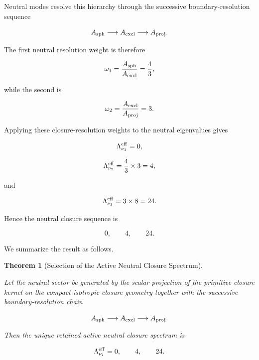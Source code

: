 \documentclass[11pt]{article}
\newtheorem{theorem}{Theorem}[section]
\theoremstyle{definition}
\theoremstyle{remark}
\begin{document}
Neutral modes resolve this hierarchy through the successive
boundary-resolution sequence

\begin{equation}
A_{\rm sph}
\longrightarrow
A_{\rm excl}
\longrightarrow
A_{\rm proj}.
\label{eq:neutral_resolution_chain}
\end{equation}

The first neutral resolution weight is therefore

\begin{equation}
\omega_1 =
\frac{A_{\rm sph}}
{A_{\rm excl}} =
\frac{4}{3},
\end{equation}

while the second is

\begin{equation}
\omega_2 =
\frac{A_{\rm excl}}
{A_{\rm proj}} =
3.
\end{equation}

Applying these closure-resolution weights to the neutral
eigenvalues gives

\begin{equation}
\Lambda_{\nu_1}^{\rm eff} =
0,
\end{equation}

\begin{equation}
\Lambda_{\nu_2}^{\rm eff} =
\frac{4}{3}
\times
3
=
4,
\end{equation}

and

\begin{equation}
\Lambda_{\nu_3}^{\rm eff} =
3
\times
8
=
24.
\end{equation}

Hence the neutral closure sequence is

\begin{equation}
0,
\qquad
4,
\qquad
24.
\label{eq:neutral_closure_sequence}
\end{equation}

We summarize the result as follows.

\begin{theorem}[Selection of the Active Neutral Closure Spectrum]
\label{thm:active_neutral_closure_selection}

Let the neutral sector be generated by the scalar projection of
the primitive closure kernel on the compact isotropic closure
geometry together with the successive boundary-resolution chain

\begin{equation}
A_{\rm sph}
\longrightarrow
A_{\rm excl}
\longrightarrow
A_{\rm proj}.
\end{equation}

Then the unique retained active neutral closure spectrum is

\begin{equation}
\Lambda_{\nu_i}^{\rm eff}
=
0,
\qquad
4,
\qquad
24.
\end{equation}

\end{theorem}
\end{document}
